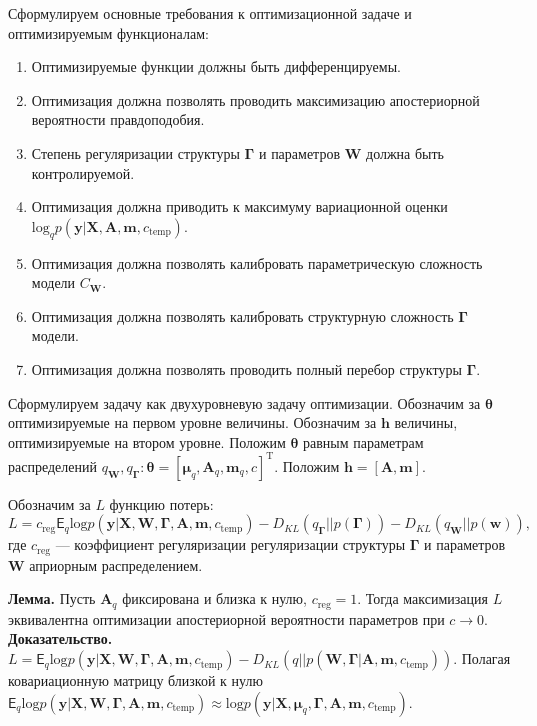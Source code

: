 \documentclass[12pt]{article}
\begin{document}
Сформулируем основные требования к оптимизационной задаче и оптимизируемым функционалам:
\begin{enumerate}
\item Оптимизируемые функции должны быть дифференцируемы.
\item Оптимизация должна позволять проводить максимизацию апостериорной вероятности правдоподобия.
\item Степень регуляризации структуры $\boldsymbol{\Gamma}$ и параметров $\mathbf{W}$ должна быть контролируемой.
\item Оптимизация должна приводить к максимуму вариационной оценки $\text{log}_q {p}(\mathbf{y}|\mathbf{X},\mathbf{A},\mathbf{m}, c_{\text{temp}})$.
\item Оптимизация должна позволять калибровать параметрическую сложность модели $C_{\mathbf{W}}$.
\item Оптимизация должна позволять калибровать структурную сложность ${\boldsymbol{\Gamma}}$ модели.
\item Оптимизация должна позволять проводить полный перебор структуры $\boldsymbol{\Gamma}$.
\end{enumerate}


Сформулируем задачу как двухуровневую задачу оптимизации. Обозначим за  $\boldsymbol{\theta}$ оптимизируемые на первом уровне величины. Обозначим за $\mathbf{h}$ величины, оптимизируемые на втором уровне.
Положим $\boldsymbol{\theta}$ равным параметрам распределений $q_{\mathbf{W}}, q_{\boldsymbol{\Gamma}}: \boldsymbol{\theta} = [\boldsymbol{\mu}_q, \mathbf{A}_q, \mathbf{m}_q, c]^\text{T}$.  
Положим $\mathbf{h} = [\mathbf{A}, \mathbf{m}].$

Обозначим за $L$ функцию потерь:
\begin{equation}
    L = c_{\text{reg}}{\mathsf{E}_{q}}\text{log} p(\mathbf{y}|\mathbf{X},\mathbf{W}, \boldsymbol{\Gamma}, \mathbf{A},\mathbf{m}, c_{\text{temp}})
 - {D_{KL}}(q_{\boldsymbol{\Gamma}}||p(\boldsymbol{\Gamma})) - {D_{KL}}(q_{\mathbf{W}}||p(\mathbf{w})),
\end{equation}
где $c_{\text{reg}}$ --- коэффициент регуляризации регуляризации структуры $\boldsymbol{\Gamma}$ и параметров $\mathbf{W}$ априорным распределением.

\textbf{Лемма.}  Пусть $\mathbf{A}_q$ фиксирована и близка к нулю, $c_{\text{reg}} =1$.  Тогда максимизация $L$ эквивалентна оптимизации апостериорной вероятности параметров при $c \to 0$.\\
\textbf{Доказательство.} 
$L = \mathsf{E}_{q}\text{log} p(\mathbf{y}|\mathbf{X},\mathbf{W}, \boldsymbol{\Gamma}, \mathbf{A},\mathbf{m}, c_{\text{temp}}) - {D_{KL}}(q||p(\mathbf{W}, \boldsymbol{\Gamma}| \mathbf{A},\mathbf{m}, c_{\text{temp}})).$
Полагая ковариационную матрицу близкой к нулю $ \mathsf{E}_{q}\text{log} p(\mathbf{y}|\mathbf{X},\mathbf{W}, \boldsymbol{\Gamma}, \mathbf{A},\mathbf{m}, c_{\text{temp}}) \approx \text{log} p(\mathbf{y}|\mathbf{X},\boldsymbol{\mu}_q, \boldsymbol{\Gamma}, \mathbf{A},\mathbf{m}, c_{\text{temp}})$.
\end{document}
